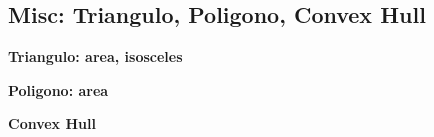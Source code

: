 \subsection{Misc: Triangulo, Poligono, Convex Hull}
    \textbf{Triangulo: area, isosceles}
    

    \textbf{Poligono: area}
    

    \textbf{Convex Hull}
    
